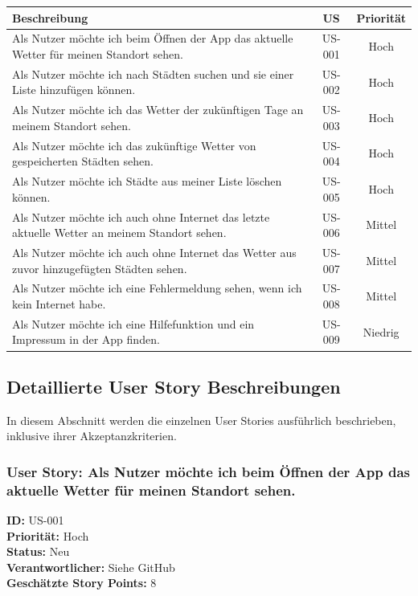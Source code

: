 \documentclass{article}
\begin{document}
\begin{center}
\begin{tabularx}{.9\textwidth}{| X | c | c |}
\hline
\textbf{Beschreibung} & \textbf{US} & \textbf{Priorität} \\
\hline
Als Nutzer möchte ich beim Öffnen der App das aktuelle Wetter für meinen Standort sehen. & US-001 & Hoch \\
\hline
Als Nutzer möchte ich nach Städten suchen und sie einer Liste hinzufügen können. & US-002 & Hoch \\
\hline
Als Nutzer möchte ich das Wetter der zukünftigen Tage an meinem Standort sehen. & US-003 & Hoch \\
\hline
Als Nutzer möchte ich das zukünftige Wetter von gespeicherten Städten sehen. & US-004 & Hoch \\
\hline
Als Nutzer möchte ich Städte aus meiner Liste löschen können. & US-005 & Hoch \\
\hline
Als Nutzer möchte ich auch ohne Internet das letzte aktuelle Wetter an meinem Standort sehen. & US-006 & Mittel \\
\hline
Als Nutzer möchte ich auch ohne Internet das Wetter aus zuvor hinzugefügten Städten sehen. & US-007 & Mittel \\
\hline
Als Nutzer möchte ich eine Fehlermeldung sehen, wenn ich kein Internet habe. & US-008 & Mittel \\
\hline
Als Nutzer möchte ich eine Hilfefunktion und ein Impressum in der App finden. & US-009 & Niedrig \\
\hline
\end{tabularx}
\end{center}

\subsection{Detaillierte User Story Beschreibungen}
In diesem Abschnitt werden die einzelnen User Stories ausführlich beschrieben, inklusive ihrer Akzeptanzkriterien.
\subsubsection{User Story: Als Nutzer möchte ich beim Öffnen der App das aktuelle Wetter für meinen Standort sehen.}
\textcolor{storyblue}{\textbf{ID:}} US-001 \\
\textcolor{storyblue}{\textbf{Priorität:}} Hoch \\
\textcolor{storyblue}{\textbf{Status:}} Neu \\
\textcolor{storyblue}{\textbf{Verantwortlicher:}} Siehe GitHub \\
\textcolor{storyblue}{\textbf{Geschätzte Story Points:}} 8
\end{document}
